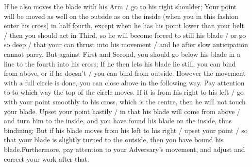 If he also moves the blade with his Arm / go to his right shoulder;
Your point will be moved as well on the outside as on the inside (when
you in this fashion enter his cross) in  half fourth, except when he
has his point lower than your belt / then you should act in Third, so
he will become forced to still his blade / or go so deep / that your
can thrust into his movement / and he after slow anticipation cannot parry.
But against First and Second, you should go below his blade in a line
to the fourth into his cross; If he then lets his blade lie still, you
can bind from above, or if he doesn't / you can bind from
outside. However the movement with a full circle is done, you can
close above in the following way. 
Pay attention to to which way the top of the circle moves. If it is
from his right to his left / go with your point smoothly to his cross,
which is the centre, then he will not touch your blade. Upset your
point hastily / in that his blade will come from above / and turn him
to the inside, and you have found his blade on the inside, thus
bindining; But if his blade moves from his left to his right / upset
your point / so that your blade is slightly turned to the outside,
then you have bound his blade.Furthermore, pay attention to your
Adversary's movement, and adjust and correct your work after that.

